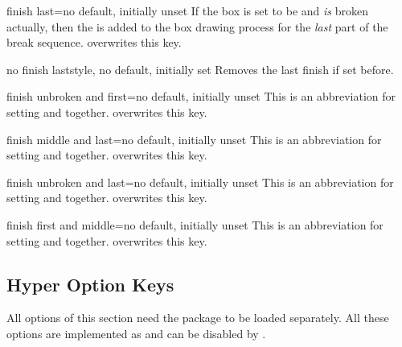 \begin{docTcbKey}{finish last}{=}{no default, initially unset}
  If the box is set to be  and \emph{is} broken actually,
  then the  is added to the box drawing process for
  the \emph{last} part of the break sequence.
   overwrites this key.
\end{docTcbKey}

\begin{docTcbKey}{no finish last}{}{style, no default, initially set}
  Removes the last finish if set before.
\end{docTcbKey}

\begin{docTcbKey}{finish unbroken and first}{=}{no default, initially unset}
  This is an abbreviation for setting
   and
   together.
   overwrites this key.
\end{docTcbKey}

\begin{docTcbKey}{finish middle and last}{=}{no default, initially unset}
  This is an abbreviation for setting
   and
   together.
   overwrites this key.
\end{docTcbKey}

\begin{docTcbKey}{finish unbroken and last}{=}{no default, initially unset}
  This is an abbreviation for setting
   and
   together.
   overwrites this key.
\end{docTcbKey}


\begin{docTcbKey}[][doc new=2014-09-19]{finish first and middle}{=}{no default, initially unset}
  This is an abbreviation for setting
   and
   together.
   overwrites this key.
\end{docTcbKey}

\clearpage
\subsection{Hyper Option Keys}\label{subsec:hyper}
All options of this section need the package  \cite{rahtz:hyperref}
to be loaded separately. All these options are implemented as
 and can be disabled by .

